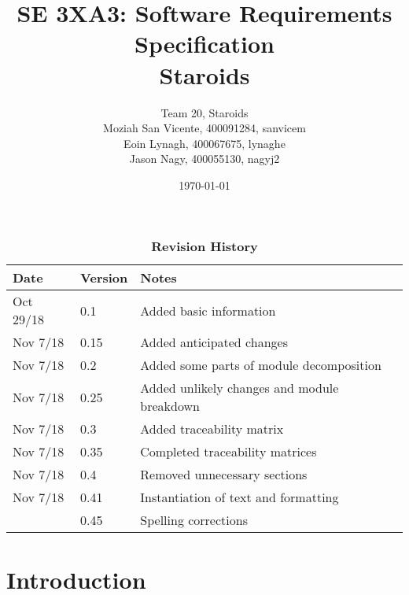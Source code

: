 \documentclass[12pt, titlepage]{article}
\title{SE 3XA3: Software Requirements Specification\\Staroids}
\author{Team 20, Staroids
  \\ Moziah San Vicente, 400091284, sanvicem
  \\ Eoin Lynagh, 400067675, lynaghe
  \\ Jason Nagy, 400055130, nagyj2
}
\date{\today}
\begin{document}
\maketitle

\tableofcontents
\listoftables
\listoffigures

\begin{table}[bp]
\caption{\bf Revision History}
\begin{tabularx}{\textwidth}{p{3cm}p{2cm}X}
\toprule {\bf Date} & {\bf Version} & {\bf Notes}\\
\midrule
Oct 29/18 & 0.1 & Added basic information\\
Nov 7/18 & 0.15 & Added anticipated changes\\
Nov 7/18 & 0.2 & Added some parts of module decomposition\\
Nov 7/18 & 0.25 & Added unlikely changes and module breakdown\\
Nov 7/18 & 0.3 & Added traceability matrix\\
Nov 7/18 & 0.35 & Completed traceability matrices\\
Nov 7/18 & 0.4 & Removed unnecessary sections\\
Nov 7/18 & 0.41 & Instantiation of text and formatting\\
\textcolor{red}{Nov 28/18 & 0.45 & Spelling corrections}\\
\bottomrule
\end{tabularx}
\end{table}

\newpage


\section{Introduction}
\end{document}
